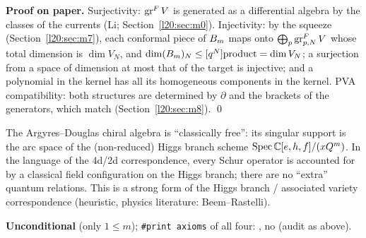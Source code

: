 \textbf{Proof on paper.} Surjectivity: $\operatorname{gr}^F V$ is generated as a differential algebra by the classes of the
currents (Li; Section~\ref{l20:sec:m0}). Injectivity: by the squeeze (Section~\ref{l20:sec:m7}), each conformal
piece of $B_m$ maps onto $\bigoplus_p\operatorname{gr}^F_{p,N}V$ whose total dimension is $\dim V_N$, and
$\dim(B_m)_N\le[q^N]\mathrm{product}=\dim V_N$; a surjection from a space of dimension at most that of
the target is injective; and a polynomial in the kernel has all its homogeneous components in the kernel. PVA
compatibility: both structures are determined by $\partial$ and the brackets of the generators, which match
(Section~\ref{l20:sec:m8}). \qed

\begin{physics}
The Argyres--Douglas chiral algebra is ``classically free'': its singular support is the arc space of the
(non-reduced) Higgs branch scheme $\operatorname{Spec}{\mathbb{C}}[e,h,f]/(xQ^m)$. In the language of the
4d/2d correspondence, every Schur operator is accounted for by a classical field configuration on the Higgs
branch; there are no ``extra'' quantum relations. This is a strong form of the Higgs branch / associated
variety correspondence (heuristic, physics literature: Beem--Rastelli).
\end{physics}

\begin{status}
\textbf{Unconditional} (only $1\le m$); \texttt{\#print axioms} of all four:
, no  (audit as above).
\end{status}

